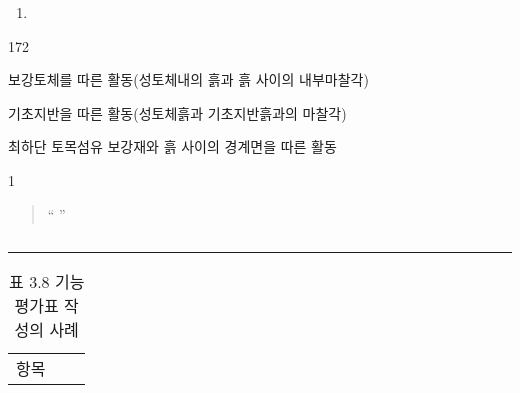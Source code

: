 \documentclass[12pt,a4paper,oneside]{book}
\begin{document}
		\begin{enumerate}[ label=\arabic*), topsep=-1.0em, itemsep=-0.5em ]
		\item	
		\end{enumerate}

		\begin{dingautolist}{172}
		\item	보강토체를 따른 활동(성토체내의 흙과 흙 사이의 내부마찰각) 
		\item	기초지반을 따른 활동(성토체흙과 기초지반흙과의 마찰각) 
		\item	최하단 토목섬유 보강재와 흙 사이의 경계면을 따른 활동 
		\end{dingautolist}

		

		\setlength{\fboxsep}{12pt}
		\begin{boxedminipage}[c]{1.0\linewidth}
		\end{boxedminipage}
		
		\begin{framed}
		1
		\end{framed}
		
		\begin{quote}
		“         ”
		\end{quote}
		
		\begin{verbatim}
		\end{verbatim}

		
		\rule{\linewidth}{1pt}

		
		\newpage  \null

		\begin{table}[hbp]
		\caption{표 3.8 기능평가표 작성의 사례}
		\centering 
		\begin{tabular}{ p{} p{} p{7cm} }
		\toprule
		\multirow{3}{*}{항목}\\	
		\multicolumn{2}{c}{기능정의}	\\
		\midrule
		\bottomrule
		\end{tabular} 
		\label{table}
		\end{table}


		\begin{tabular}{ p{} p{} p{7cm} }
		\end{tabular} 
		
\end{document}

